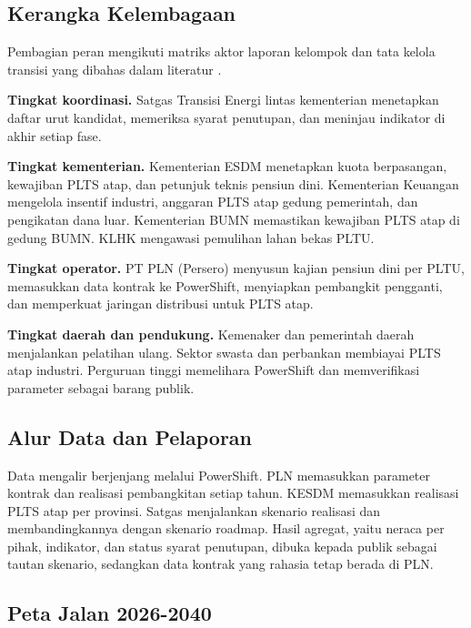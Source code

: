\subsection{Kerangka Kelembagaan}

Pembagian peran mengikuti matriks aktor laporan kelompok \cite{L-LAPORAN-K17} dan tata kelola transisi yang dibahas dalam literatur \cite{P-RESOSUDARMO-2023}.

\textbf{Tingkat koordinasi.} Satgas Transisi Energi lintas kementerian menetapkan daftar urut kandidat, memeriksa syarat penutupan, dan meninjau indikator di akhir setiap fase.

\textbf{Tingkat kementerian.} Kementerian ESDM menetapkan kuota berpasangan, kewajiban PLTS atap, dan petunjuk teknis pensiun dini. Kementerian Keuangan mengelola insentif industri, anggaran PLTS atap gedung pemerintah, dan pengikatan dana luar. Kementerian BUMN memastikan kewajiban PLTS atap di gedung BUMN. KLHK mengawasi pemulihan lahan bekas PLTU.

\textbf{Tingkat operator.} PT PLN (Persero) menyusun kajian pensiun dini per PLTU, memasukkan data kontrak ke PowerShift, menyiapkan pembangkit pengganti, dan memperkuat jaringan distribusi untuk PLTS atap.

\textbf{Tingkat daerah dan pendukung.} Kemenaker dan pemerintah daerah menjalankan pelatihan ulang. Sektor swasta dan perbankan membiayai PLTS atap industri. Perguruan tinggi memelihara PowerShift dan memverifikasi parameter sebagai barang publik.

\subsection{Alur Data dan Pelaporan}

Data mengalir berjenjang melalui PowerShift. PLN memasukkan parameter kontrak dan realisasi pembangkitan setiap tahun. KESDM memasukkan realisasi PLTS atap per provinsi. Satgas menjalankan skenario realisasi dan membandingkannya dengan skenario roadmap. Hasil agregat, yaitu neraca per pihak, indikator, dan status syarat penutupan, dibuka kepada publik sebagai tautan skenario, sedangkan data kontrak yang rahasia tetap berada di PLN.

\subsection{Peta Jalan 2026-2040}

